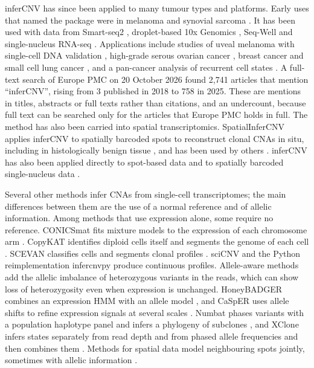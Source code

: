 inferCNV has since been applied to many tumour types and platforms. Early uses that named the package were in melanoma \citep{jerbyarnon2018} and synovial sarcoma \citep{jerbyarnon2021}. It has been used with data from Smart-seq2 \citep{maynard2020}, droplet-based 10x Genomics \citep{ma2019, bi2021, steen2021}, Seq-Well \citep{raghavan2021} and single-nucleus RNA-seq \citep{slyper2020, terekhanova2023}. Applications include studies of uveal melanoma with single-cell DNA validation \citep{durante2020}, high-grade serous ovarian cancer \citep{izar2020}, breast cancer \citep{wu2021breast} and small cell lung cancer \citep{chan2021}, and a pan-cancer analysis of recurrent cell states \citep{barkley2022}. A full-text search of Europe PMC on 20 October 2026 found 2,741 articles that mention ``inferCNV'', rising from 3 published in 2018 to 758 in 2025. These are mentions in titles, abstracts or full texts rather than citations, and an undercount, because full text can be searched only for the articles that Europe PMC holds in full. The method has also been carried into spatial transcriptomics. SpatialInferCNV applies inferCNV to spatially barcoded spots to reconstruct clonal CNAs in situ, including in histologically benign tissue \citep{erickson2022}, and has been used by others \citep{pei2025}. inferCNV has also been applied directly to spot-based data \citep{wu2021liver, denisenko2024, lucas2024, mo2024, harwood2024} and to spatially barcoded single-nucleus data \citep{russell2024}.

Several other methods infer CNAs from single-cell transcriptomes; the main differences between them are the use of a normal reference and of allelic information. Among methods that use expression alone, some require no reference. CONICSmat fits mixture models to the expression of each chromosome arm \citep{muller2018conics}. CopyKAT identifies diploid cells itself and segments the genome of each cell \citep{gao2021copykat}. SCEVAN classifies cells and segments clonal profiles \citep{defalco2023}. sciCNV \citep{mahdipourshirayeh2022scicnv} and the Python reimplementation infercnvpy \citep{sturm_infercnvpy} produce continuous profiles. Allele-aware methods add the allelic imbalance of heterozygous variants in the reads, which can show loss of heterozygosity even when expression is unchanged. HoneyBADGER combines an expression HMM with an allele model \citep{fan2018}, and CaSpER uses allele shifts to refine expression signals at several scales \citep{serinharmanci2020}. Numbat phases variants with a population haplotype panel and infers a phylogeny of subclones \citep{gao2023numbat}, and XClone infers states separately from read depth and from phased allele frequencies and then combines them \citep{huang2024xclone}. Methods for spatial data model neighbouring spots jointly, sometimes with allelic information \citep{elyanow2021starch, ma2024calicost}.

